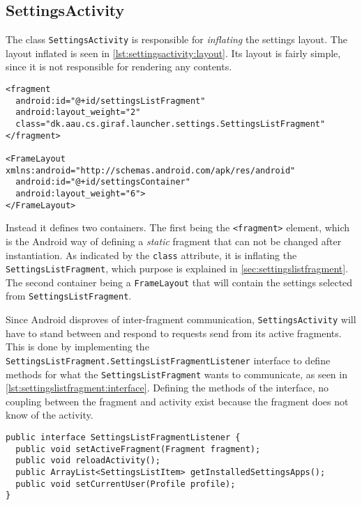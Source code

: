 \subsection{SettingsActivity}
The class \lstinline|SettingsActivity| is responsible for \textit{inflating} the settings layout.
The layout inflated is seen in \cref{lst:settingsactivity:layout}.
Its layout is fairly simple, since it is not responsible for rendering any contents.

\begin{lstlisting}[caption={Excerpt of the layout defined for \lstinline|SettingsActivity|.}, label={lst:settingsactivity:layout}]
<fragment
  android:id="@+id/settingsListFragment"
  android:layout_weight="2"
  class="dk.aau.cs.giraf.launcher.settings.SettingsListFragment"
</fragment>

<FrameLayout xmlns:android="http://schemas.android.com/apk/res/android"
  android:id="@+id/settingsContainer"
  android:layout_weight="6">
</FrameLayout>
\end{lstlisting}

Instead it defines two containers.
The first being the \lstinline|<fragment>| element, which is the Android way of defining a \textit{static} fragment that can not be changed after instantiation.
As indicated by the \lstinline|class| attribute, it is inflating the \lstinline|SettingsListFragment|, which purpose is explained in \cref{sec:settingslistfragment}.
The second container being a \lstinline|FrameLayout| that will contain the settings selected from \lstinline|SettingsListFragment|.

Since Android disproves of inter-fragment communication, \lstinline|SettingsActivity| will have to stand between and respond to requests send from its active fragments.
This is done by implementing the \lstinline|SettingsListFragment.SettingsListFragmentListener| interface to define methods for what the \lstinline|SettingsListFragment| wants to communicate, as seen in \cref{lst:settingslistfragment:interface}.
Defining the methods of the interface, no coupling between the fragment and activity exist because the fragment does not know of the activity.

\begin{lstlisting}[caption={The interface implemented in \lstinline|SettingsActivity| defined in \lstinline|SettingsListFragment|.}, label={lst:settingslistfragment:interface}]
public interface SettingsListFragmentListener {
  public void setActiveFragment(Fragment fragment);
  public void reloadActivity();
  public ArrayList<SettingsListItem> getInstalledSettingsApps();
  public void setCurrentUser(Profile profile);
}
\end{lstlisting}

